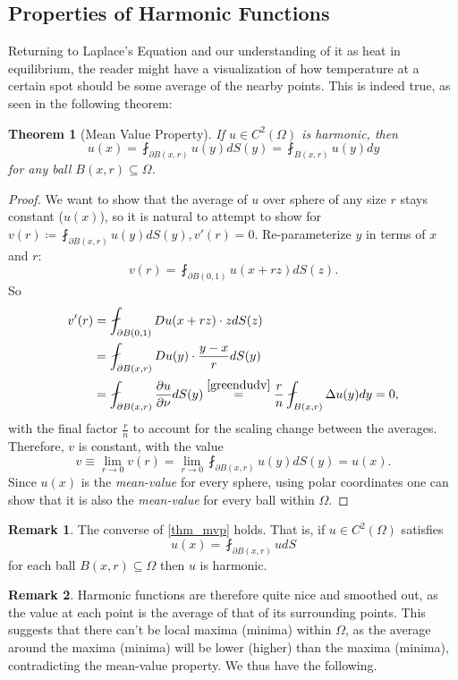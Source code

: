 \documentclass[openany, amssymb, psamsfonts]{amsart}
\newtheorem{thm}{Theorem}[section]
\theoremstyle{definition}
\newtheorem{rem}{Remark}[section]
\numberwithin{equation}{section}
\begin{document}
\subsection{Properties of Harmonic Functions}
Returning to Laplace's Equation and our understanding of it as heat in equilibrium, the reader might have a visualization of how temperature at a certain spot should be some average of the nearby points. This is indeed true, as seen in the following theorem:
\begin{thm} [Mean Value Property] \label{thm_mvp}
If $u \in C^2 (\Omega)$ is harmonic, then \[
u(x) = \fint_{\partial B(x, r)} u(y) dS(y) = \fint_{B(x, r)} u(y) dy
\]
for any ball $B(x, r) \subseteq \Omega$.
\end{thm}
\begin{proof}
    We want to show that the average of $u$ over sphere of any size $r$ stays constant ($u(x)$), so it is natural to attempt to show for $v(r) \coloneqq \fint_{\partial B(x, r)} u(y) dS(y), v'(r) = 0$. Re-parameterize $y$ in terms of $x$ and $r$: \begin{equation*}
        v(r) = \fint_{\partial B(0, 1)} u(x + rz) dS(z).
    \end{equation*}
    So
    \begin{align*}
        v'(r) &= \fint_{\partial B(0, 1)} Du(x + rz) \cdot z dS(z) \\
        &= \fint_{\partial B(x, r)} Du(y) \cdot \dfrac{y-x}{r} dS(y) \\
        &= \fint_{\partial B(x, r)} \dfrac{\partial u}{\partial \nu} dS(y) \stackrel{\eqref{greendudv}}{=} \dfrac{r}{n} \fint_{B(x, r)} \Delta u(y) dy = 0,
    \end{align*}
    with the final factor $\frac{r}{n}$ to account for the scaling change between the averages. Therefore, $v$ is constant, with the value \[
    v \equiv \lim_{r \to 0} v(r) = \lim_{r \to 0} \fint_{\partial B(x, r)} u(y) dS(y) = u(x).
    \]
    Since $u(x)$ is the \textit{mean-value} for every sphere, using polar coordinates one can show that it is also the \textit{mean-value} for every ball within $\Omega$.
\end{proof}
\begin{rem}
    The converse of \autoref{thm_mvp} holds. That is, if $u \in C^2(\Omega)$ satisfies \[
    u(x) = \fint_{\partial B(x, r)} u dS
    \]
    for each ball $B(x, r) \subseteq \Omega$ then $u$ is harmonic.
\end{rem}
\begin{rem}
Harmonic functions are therefore quite nice and smoothed out, as the value at each point is the average of that of its surrounding points. This suggests that there can't be local maxima (minima) within $\Omega$, as the average around the maxima (minima) will be lower (higher) than the maxima (minima), contradicting the mean-value property. We thus have the following.
\end{rem}
\end{document}
